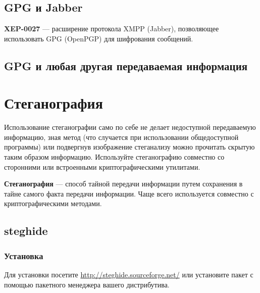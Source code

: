 \subsection{GPG и Jabber}
\textbf{XEP-0027} --- расширение протокола XMPP (Jabber), позволяющее использовать GPG (OpenPGP) для шифрования сообщений\cite{xep-0027}. 
\subsection{GPG и любая другая передаваемая информация}

\section{Стеганография}
\begin{important}
Использование стеганографии само по себе не делает недоступной передаваемую информацию, зная метод (что случается при использовании общедоступной программы) или подвергнув изображение стеганализу можно прочитать скрытую таким образом информацию. Используйте стеганографию совместно со сторонними или встроенными криптографическими утилитами.
\end{important}
\textbf{Стеганография} --- способ тайной передачи информации путем сохранения в тайне самого факта передачи информации. Чаще всего используется совместно с криптографическими методами.
\subsection{steghide}
\subsubsection{Установка}
Для установки посетите \url{http://steghide.sourceforge.net/} или установите пакет с помощью пакетного менеджера вашего дистрибутива.
